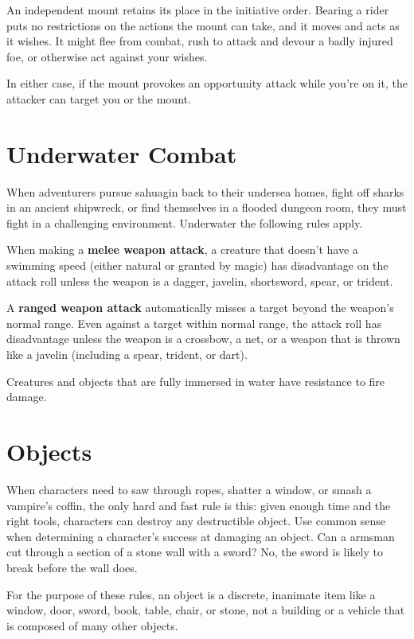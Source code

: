 An independent mount retains its place in the initiative order. Bearing a rider puts no restrictions on the actions the mount can take, and it moves and acts as it wishes. It might flee from combat, rush to attack and devour a badly injured foe, or otherwise act against your wishes.

In either case, if the mount provokes an opportunity attack while you're on it, the attacker can target you or the mount.

\section{Underwater Combat}

When adventurers pursue sahuagin back to their undersea homes, fight off sharks in an ancient shipwreck, or find themselves in a flooded dungeon room, they must fight in a challenging environment. Underwater the following rules apply.

When making a \textbf{melee weapon attack}, a creature that doesn't have a swimming speed (either natural or granted by magic) has disadvantage on the attack roll unless the weapon is a dagger, javelin, shortsword, spear, or trident.

A \textbf{ranged weapon attack} automatically misses a target beyond the weapon's normal range. Even against a target within normal range, the attack roll has disadvantage unless the weapon is a crossbow, a net, or a weapon that is thrown like a javelin (including a spear, trident, or dart).

Creatures and objects that are fully immersed in water have resistance to fire damage.

\section{Objects}

When characters need to saw through ropes, shatter a window, or smash a vampire's coffin, the only hard and fast rule is this: given enough time and the right tools, characters can destroy any destructible object. Use common sense when determining a character's success at damaging an object. Can a armsman cut through a section of a stone wall with a sword? No, the sword is likely to break before the wall does.

For the purpose of these rules, an object is a discrete, inanimate item like a window, door, sword, book, table, chair, or stone, not a building or a vehicle that is composed of many other objects.

